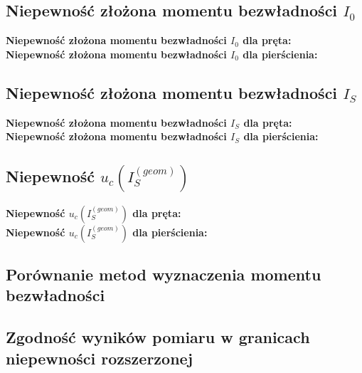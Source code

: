 \documentclass[a4paper,11pt]{article}
\begin{document}
\subsection{Niepewność złożona momentu bezwładności $I_{0}$}
\textbf{Niepewność złożona momentu bezwładności $I_{0}$ dla pręta:}
$$$$
\textbf{Niepewność złożona momentu bezwładności $I_{0}$ dla pierścienia:}

\subsection{Niepewność złożona momentu bezwładności $I_{S}$}
\textbf{Niepewność złożona momentu bezwładności $I_{S}$ dla pręta:}
$$$$
\textbf{Niepewność złożona momentu bezwładności $I_{S}$ dla pierścienia:}

\subsection{Niepewność $u_{c}(I_{S}^{(geom)})$}
\textbf{Niepewność $u_{c}(I_{S}^{(geom)})$ dla pręta:}
$$$$
\textbf{Niepewność $u_{c}(I_{S}^{(geom)})$ dla pierścienia:}

\subsection{Porównanie metod wyznaczenia momentu bezwładności}

\subsection{Zgodność wyników pomiaru w granicach niepewności rozszerzonej}
\end{document}
